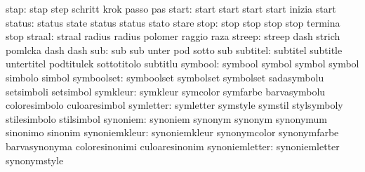                      stap: stap                      step
                           schritt                   krok
                           passo                     pas
                    start: start                     start
                           start                     start
                           inizia                    start
                   status: status                    state
                           status                    status
                           stato                     stare
                     stop: stop                      stop
                           stop                      stop
                           termina                   stop
                   straal: straal                    radius
                           radius                    polomer
                           raggio                    raza
                   streep: streep                    dash
                           strich                    pomlcka
                           dash                      dash %
                      sub: sub                       sub
                           unter                     pod
                           sotto                     sub
                 subtitel: subtitel                  subtitle
                           untertitel                podtitulek
                           sottotitolo               subtitlu
                  symbool: symbool                   symbol
                           symbol                    symbol
                           simbolo                   simbol
               symboolset: symboolset                symbolset
                           symbolset                 sadasymbolu
                           setsimboli                setsimbol
                 symkleur: symkleur                  symcolor
                           symfarbe                  barvasymbolu
                           coloresimbolo             culoaresimbol
                symletter: symletter                 symstyle
                           symstil                   stylsymboly
                           stilesimbolo              stilsimbol
                 synoniem: synoniem                  synonym
                           synonym                   synonymum
                           sinonimo                  sinonim
            synoniemkleur: synoniemkleur             synonymcolor
                           synonymfarbe              barvasynonyma
                           coloresinonimi            culoaresinonim
           synoniemletter: synoniemletter            synonymstyle
